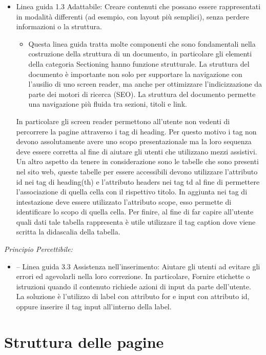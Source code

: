 \documentclass[a4paper,final,12pt]{report}
\begin{document}
\begin{itemize}
\item Linea guida 1.3 Adattabile: Creare contenuti che possano essere rappresentati in modalità differenti (ad esempio, con layout più semplici), senza perdere informazioni o la struttura.
\begin{itemize}
\item Questa linea guida tratta molte componenti che sono fondamentali nella costruzione della struttura di un documento, in particolare gli elementi della categoria Sectioning hanno funzione strutturale. La struttura del documento è importante non solo per supportare la navigazione con l'ausilio di uno screen reader, ma anche per ottimizzare l'indicizzazione da parte dei motori di ricerca (SEO). La struttura del documento permette una navigazione più fluida tra sezioni, titoli e link.
\end{itemize}
In particolare gli screen reader permettono all'utente non vedenti di percorrere la pagine attraverso i tag di heading. Per questo motivo i tag non devono assolutamente avere uno scopo presentazionale ma la loro sequenza deve essere corretta al fine di aiutare gli utenti che utilizzano mezzi assistivi.\\
Un altro aspetto da tenere in considerazione sono le tabelle che sono presenti nel sito web, queste tabelle per essere accessibili devono utilizzare l'attributo id nei tag di heading(th) e l'attributo headers nei tag td al fine di permettere l'associazione di quella cella con il rispettivo titolo. In aggiunta nei tag di intestazione deve essere utilizzato l'attributo scope, esso permette di identificare lo scopo di quella cella. Per finire, al fine di far capire all'utente quali dati tale tabella rappresenta è utile utilizzare il tag caption dove viene scritta la didascalia della tabella.
\end{itemize}
\emph{Principio Percettibile:}
\begin{itemize}
\item – Linea guida 3.3 Assistenza nell'inserimento: Aiutare gli utenti ad evitare gli errori ed agevolarli nella loro correzione. In particolare,  Fornire etichette o istruzioni quando il contenuto richiede azioni di input da parte dell'utente.\\
La soluzione è l'utilizzo di label con attributo for e input con attributo id, oppure inserire il tag input all'interno della label.
\end{itemize}

\section{Struttura delle pagine}
\end{document}
